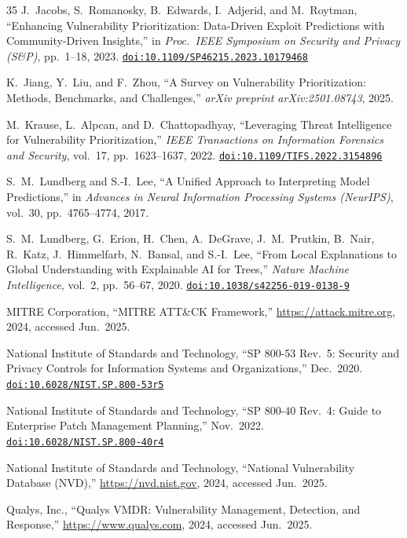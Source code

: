 \documentclass[review,12pt]{elsarticle}
\providecommand{\doi}[1]{\href{https://doi.org/#1}{\texttt{doi:#1}}}
\begin{document}
\begin{thebibliography}{35}
J.~Jacobs, S.~Romanosky, B.~Edwards, I.~Adjerid, and M.~Roytman,
``Enhancing Vulnerability Prioritization: Data-Driven Exploit Predictions with Community-Driven Insights,''
in \emph{Proc.\ IEEE Symposium on Security and Privacy (S\&P)},
pp.~1--18, 2023.
\doi{10.1109/SP46215.2023.10179468}

K.~Jiang, Y.~Liu, and F.~Zhou,
``A Survey on Vulnerability Prioritization: Methods, Benchmarks, and Challenges,''
\emph{arXiv preprint arXiv:2501.08743},
2025.

M.~Krause, L.~Alpcan, and D.~Chattopadhyay,
``Leveraging Threat Intelligence for Vulnerability Prioritization,''
\emph{IEEE Transactions on Information Forensics and Security},
vol.~17, pp.~1623--1637, 2022.
\doi{10.1109/TIFS.2022.3154896}

S.~M.~Lundberg and S.-I.~Lee,
``A Unified Approach to Interpreting Model Predictions,''
in \emph{Advances in Neural Information Processing Systems (NeurIPS)},
vol.~30, pp.~4765--4774, 2017.

S.~M.~Lundberg, G.~Erion, H.~Chen, A.~DeGrave, J.~M.~Prutkin, B.~Nair,
R.~Katz, J.~Himmelfarb, N.~Bansal, and S.-I.~Lee,
``From Local Explanations to Global Understanding with Explainable AI for Trees,''
\emph{Nature Machine Intelligence}, vol.~2, pp.~56--67, 2020.
\doi{10.1038/s42256-019-0138-9}

MITRE Corporation,
``MITRE ATT\&CK Framework,''
\url{https://attack.mitre.org},
2024, accessed Jun.\ 2025.

National Institute of Standards and Technology,
``SP 800-53 Rev.\ 5: Security and Privacy Controls for Information Systems and Organizations,''
Dec.\ 2020.
\doi{10.6028/NIST.SP.800-53r5}

National Institute of Standards and Technology,
``SP 800-40 Rev.\ 4: Guide to Enterprise Patch Management Planning,''
Nov.\ 2022.
\doi{10.6028/NIST.SP.800-40r4}

National Institute of Standards and Technology,
``National Vulnerability Database (NVD),''
\url{https://nvd.nist.gov},
2024, accessed Jun.\ 2025.

Qualys, Inc.,
``Qualys VMDR: Vulnerability Management, Detection, and Response,''
\url{https://www.qualys.com},
2024, accessed Jun.\ 2025.


\end{thebibliography}
\end{document}
